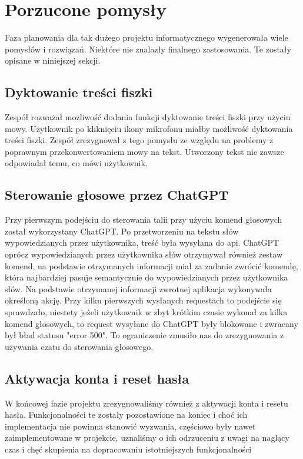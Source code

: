 \section{Porzucone pomysły}
Faza planowania dla tak dużego projektu informatycznego wygenerowała wiele pomysłów i rozwiązań. Niektóre nie znalazły finalnego zastosowania. Te zostały opisane w niniejszej sekcji.

\subsection{Dyktowanie treści fiszki}
Zespół rozważał możliwość dodania funkcji dyktowanie treści fiszki przy użyciu mowy. Użytkownik po kliknięciu ikony mikrofonu miałby możliwość dyktowania treści fiszki. Zespół zrezygnował z tego pomysłu ze względu na problemy z poprawnym przekonwertowaniem mowy na tekst. Utworzony tekst nie zawsze odpowiadał temu, co mówi użytkownik.

\subsection{Sterowanie głosowe przez ChatGPT}
Przy pierwszym podejściu do sterowania talii przy użyciu komend głosowych został wykorzystany ChatGPT. Po przetworzeniu na tekstu słów wypowiedzianych przez użytkownika, treść była wysyłana do api. ChatGPT oprócz wypowiedzianych przez użytkownika słów otrzymywał również zestaw komend, na podstawie otrzymanych informacji miał za zadanie zwrócić komendę, która najbardziej pasuje semantycznie do wypowiedzianych przez użytkownika słów. Na podstawie otrzymanej informacji zwrotnej aplikacja wykonywała określoną akcję. Przy kilku pierwszych wysłanych requestach to podejście się sprawdzało, niestety jeżeli użytkownik w zbyt krótkim czasie wykonał za kilka komend głosowych, to request wysyłane do ChatGPT były blokowane i zwracany był bład statusu "error 500". To ograniczenie zmusiło nas do zrezygnowania z używania czatu do sterowania głosowego.

\subsection{Aktywacja konta i reset hasła}
W końcowej fazie projektu zrezygnowaliśmy również z aktywacji konta i resetu hasła. Funkcjonalności te zostały pozostawione na koniec i choć ich implementacja nie powinna stanowić wyzwania, częściowo były nawet zaimplementowane w projekcie,  uznaliśmy o ich odrzuceniu z uwagi na naglący czas i chęć skupienia na dopracowaniu istotniejszych funkcjonalności


